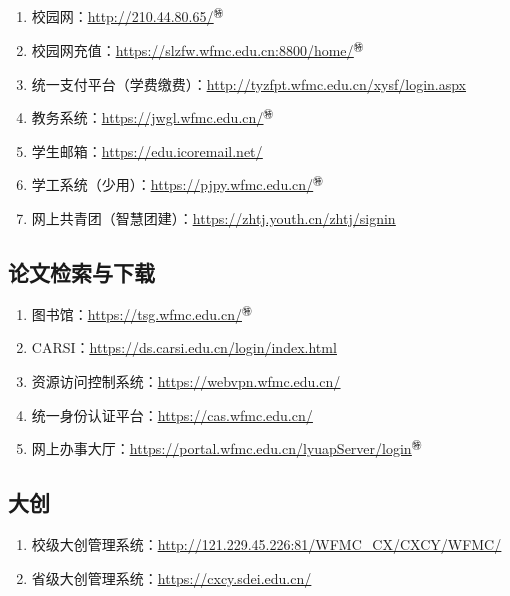\subsection[日常使用]{\textbf{}}
\begin{enumerate}
    \item 校园网：\uline{\href{http://210.44.80.65/}{http://210.44.80.65/}$^㊕$}
    \item 校园网充值：\uline{\href{https://slzfw.wfmc.edu.cn:8800/home/}{https://slzfw.wfmc.edu.cn:8800/home/}$^㊕$}
    \item 统一支付平台（学费缴费）：\uline{\href{http://tyzfpt.wfmc.edu.cn/xysf/login.aspx}{http://tyzfpt.wfmc.edu.cn/xysf/login.aspx}}
    \item 教务系统：\uline{\href{https://jwgl.wfmc.edu.cn/}{https://jwgl.wfmc.edu.cn/}$^㊕$}
    \item 学生邮箱：\uline{\href{https://edu.icoremail.net/}{https://edu.icoremail.net/}}
    \item 学工系统（少用）：\uline{\href{https://pjpy.wfmc.edu.cn/}{https://pjpy.wfmc.edu.cn/}$^㊕$}
    \item 网上共青团（智慧团建）：\uline{\href{https://zhtj.youth.cn/zhtj/signin}{https://zhtj.youth.cn/zhtj/signin}}
\end{enumerate}

\subsection[论文检索与下载]{论文检索与下载}
\begin{enumerate}
    \item 图书馆：\uline{\href{https://tsg.wfmc.edu.cn/}{https://tsg.wfmc.edu.cn/}$^㊕$}
    \item CARSI：\uline{\href{https://ds.carsi.edu.cn/login/index.html}{https://ds.carsi.edu.cn/login/index.html}}
    \item 资源访问控制系统：\uline{\href{https://webvpn.wfmc.edu.cn/}{https://webvpn.wfmc.edu.cn/}}
    \item 统一身份认证平台：\uline{\href{https://cas.wfmc.edu.cn/}{https://cas.wfmc.edu.cn/}}
    \item 网上办事大厅：\uline{\href{https://portal.wfmc.edu.cn/lyuapServer/login}{https://portal.wfmc.edu.cn/lyuapServer/login}$^㊕$}
\end{enumerate}

\subsection[大创]{大创\footnotemark}
\begin{enumerate}
    \item 校级大创管理系统：\uline{\href{http://121.229.45.226:81/WFMC\_CX/CXCY/WFMC/}{http://121.229.45.226:81/WFMC\_CX/CXCY/WFMC/}}
    \item 省级大创管理系统：\uline{\href{https://cxcy.sdei.edu.cn/}{https://cxcy.sdei.edu.cn/}}
\end{enumerate}

